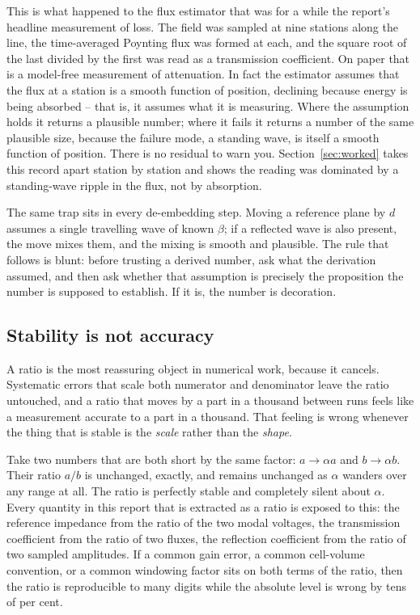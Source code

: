This is what happened to the flux estimator that was for a while the report's headline measurement of loss. The
field was sampled at nine stations along the line, the time-averaged Poynting flux was formed at each, and the
square root of the last divided by the first was read as a transmission coefficient. On paper that is a
model-free measurement of attenuation. In fact the estimator assumes that the flux at a station is a smooth
function of position, declining because energy is being absorbed -- that is, it assumes what it is measuring.
Where the assumption holds it returns a plausible number; where it fails it returns a number of the same
plausible size, because the failure mode, a standing wave, is itself a smooth function of position. There is no
residual to warn you. Section~\ref{sec:worked} takes this record apart station by station and shows the reading
was dominated by a standing-wave ripple in the flux, not by absorption.

The same trap sits in every de-embedding step. Moving a reference plane by $d$ assumes a single travelling wave
of known $\beta$; if a reflected wave is also present, the move mixes them, and the mixing is smooth and
plausible. The rule that follows is blunt: before trusting a derived number, ask what the derivation assumed,
and then ask whether that assumption is precisely the proposition the number is supposed to establish. If it
is, the number is decoration.

\subsection{Stability is not accuracy}
\label{sec:method-stability}

A ratio is the most reassuring object in numerical work, because it cancels. Systematic errors that scale both
numerator and denominator leave the ratio untouched, and a ratio that moves by a part in a thousand between runs
feels like a measurement accurate to a part in a thousand. That feeling is wrong whenever the thing that is
stable is the \emph{scale} rather than the \emph{shape}.

Take two numbers that are both short by the same factor: $a \to \alpha a$ and $b \to \alpha b$. Their ratio
$a/b$ is unchanged, exactly, and remains unchanged as $\alpha$ wanders over any range at all. The ratio is
perfectly stable and completely silent about $\alpha$. Every quantity in this report that is extracted as a
ratio is exposed to this: the reference impedance from the ratio of the two modal voltages, the transmission
coefficient from the ratio of two fluxes, the reflection coefficient from the ratio of two sampled amplitudes.
If a common gain error, a common cell-volume convention, or a common windowing factor sits on both terms of the
ratio, then the ratio is reproducible to many digits while the absolute level is wrong by tens of per cent.

